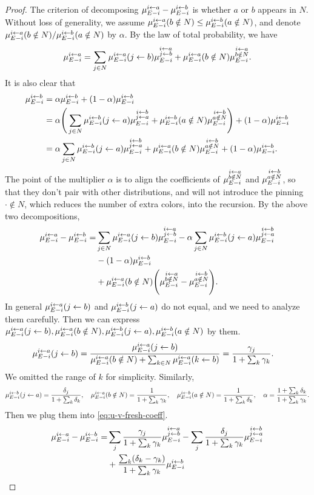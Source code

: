 \documentclass[a4paper,11pt]{article}
\newcommand{\pin}{\leftarrow}
\begin{document}
\begin{proof}
    The criterion of decomposing $\ma-\mb$ is whether
    $a$ or $b$ appears in $N$.
    Without loss of generality, we assume $\pan\le\pbn$,
    and denote $\pan/\pbn$ by $\alpha$.
    By the law of total probability, we have
    \begin{align}
        \ma = \sjn\pab\mab + \pan\man.
    \end{align}
    It is also clear that
    \begin{align*}
        \mb
          &= \alpha \mb + (1-\alpha) \mb
        \\&= \alpha \Bigg(\sjn\pba\mba + \pbn\mbn\Bigg)
         + (1-\alpha) \mb
        \\&= \alpha \sjn\pba\mba + \pan\mbn + (1-\alpha)\mb.
    \end{align*}
    The point of the multiplier $\alpha$ is to align the coefficients
    of $\man$ and $\mbn$, so that they don't pair with other distributions,
    and will not introduce the pinning $\cdot\notin N$, which reduces the 
    number of extra colors, into the recursion.
    By the above two decompositions,
    \begin{align}
           \ma - \mb
          =&\sjn\pab\mab - \alpha\sjn\pba\mba
            \notag
        \\&-(1-\alpha)\mb
            \notag
        \\&+\pan\Bigg(\man-\mbn\Bigg).
        \label{eq:u-v-fresh-coeff}
    \end{align}
    In general $\pab$ and $\pba$ do not equal, and we need to analyze them carefully.
    Then we can express $\pab,\pan,\pba,\pbn$ by them.
    \begin{align*}
          \pab &= \frac{\pab}{\pan+\sum_{k\in N} \ma(k\pin b)} = \frac{\gamma_j}{1+\sum_k\gamma_{k}}.
    \end{align*}
    We omitted the range of $k$ for simplicity.
    Similarly,
    \begin{align*}
             \pba = \frac{\delta_j}{1+\sum_{k}\delta_k},
       \quad \pan = \frac{1}{1+\sum_k\gamma_k},
       \quad \pbn = \frac{1}{1+\sum_k\delta_k},
       \quad \alpha = \frac{1+\sum_k\delta_k}{1+\sum_k\gamma_k}.
    \end{align*}
    Then we plug them into \cref{eq:u-v-fresh-coeff}.
    \newcommand{\zz}{1+\sum_k\gamma_k}
    \begin{align*}
           \ma - \mb
          =&\sj\frac{\gamma_j}{\zz}\mab - \sj\frac{\delta_j}{\zz}\mba
        \\&+\frac{\sum_k(\delta_k-\gamma_k)}{ 1 + \sum_k\gamma_k}\mb

\end{align*}
\end{proof}
\end{document}
